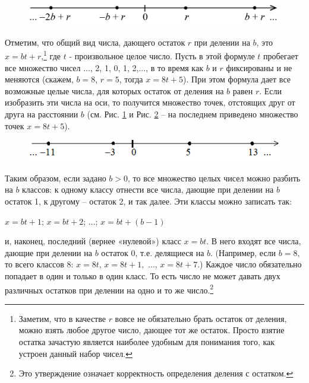 \begin{figure}[h]
  \centering
\includegraphics[width=.5\linewidth]{./img/axis3}
  \caption{}
  \label{axis3}
\end{figure}

Отметим, что общий вид числа, дающего остаток $r$ при делении на $b$, это $x = bt + r$,\footnote{Заметим, что в качестве $r$ вовсе не обязательно брать остаток от деления, можно взять любое другое число, дающее тот же остаток. Просто взятие остатка зачастую является наиболее удобным для понимания того, как устроен данный набор чисел.} где $t$ - произвольное целое число. Пусть в этой формуле $t$ пробегает все множество чисел {..., 2, 1, 0, 1, 2,...}, в то время как $b$ и $r$ фиксированы и не меняются (скажем, $b=8$,  $r=5$, тогда $x=8t+5$). При этом формула дает все возможные целые числа, для которых остаток от деления на $b$ равен $r$. Если изобразить эти числа на оси, то получится множество точек, отстоящих друг от друга на расстоянии $b$ (см. Рис. \ref{axis3} и Рис. \ref{axis4} – на последнем приведено множество точек $x=8t+5$).

\begin{figure}[h]
  \centering
\includegraphics[width=.5\linewidth]{./img/axis4}
  \caption{}
  \label{axis4}
\end{figure}

Таким образом, если задано $b > 0$, то все множество целых чисел можно разбить на $b$ классов: к одному классу отнести все числа, дающие при делении на $b$ остаток 1, к другому – остаток 2, и так далее. Эти классы можно записать так:

\begin{center}
    $x=bt+1$; \hspace{3mm} $x=bt+2$; \hspace{3mm} ...; \hspace{3mm} $x=bt+(b-1)$
\end{center} 

и, наконец, последний (вернее «нулевой») класс $x = bt$. В него входят все числа, дающие при делении на $b$ остаток 0, т.е. делящиеся на $b$. (Например, если $b=8$, то всего классов 8: $x = 8t$, $x = 8t + 1,$ ..., $x = 8t + 7$.) Каждое число обязательно попадает в один и только в один класс. То есть число не может давать двух различных остатков при делении на одно и то же число.\footnote{Это утверждение означает корректность определения деления с остатком.}

